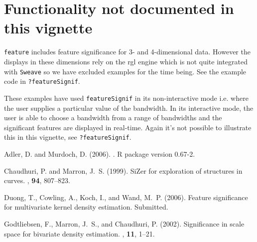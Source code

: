 \documentclass[a4paper,11pt]{article}
\begin{document}
\section{Functionality not documented in this vignette}

\texttt{feature} includes 
feature significance for 3- and 4-dimensional
data. However the displays in these dimensions rely on the rgl engine
\citep{rgl} which is not quite integrated with \texttt{Sweave} 
so we have excluded examples for the time being. See 
the example code in \texttt{?featureSignif}.   

These examples have used \texttt{featureSignif} in its non-interactive
mode i.e. where the user supplies a particular value of the bandwidth. 
In its interactive mode, the user is able to choose a
bandwidth from a range of bandwidths and the significant features are
displayed in real-time.
Again it's not possible to illustrate this in this vignette,
see \texttt{?featureSignif}.   
 



%

\begin{thebibliography}{}

Adler, D. and Murdoch, D. (2006).
.
\newblock R package version 0.67-2.

Chaudhuri, P. and Marron, J.~S. (1999).
\newblock Si{Z}er for exploration of structures in curves.
, \textbf{94}, 807--823.

Duong, T., Cowling, A., Koch, I., and Wand, M.~P. (2006).
\newblock Feature significance for multivariate kernel density estimation.
\newblock Submitted.

Godtliebsen, F., Marron, J.~S., and Chaudhuri, P. (2002).
\newblock Significance in scale space for bivariate density estimation.
, \textbf{11}, 1--21.

\end{thebibliography}
\end{document}
